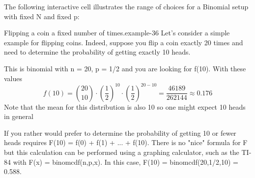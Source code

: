 \documentclass[10pt,]{book}
\numberwithin{equation}{section}
\begin{document}
\hypertarget{p-904}{}%
The following interactive cell illustrates the range of choices for a Binomial setup with fixed N and fixed p:%
\par
\hypertarget{p-905}{}%
\leavevmode%
%
\begin{example}{Flipping a coin a fixed number of times.}{example-36}%
\hypertarget{p-906}{}%
Let's consider a simple example for flipping coins. Indeed, suppose you flip a coin exactly 20 times and need to determine the probability of getting exactly 10 heads.%
\par
\hypertarget{p-907}{}%
This is binomial with n = 20, p = 1/2 and you are looking for f(10). With these values%
\begin{equation*}
f(10) = \binom{20}{10} \cdot \left ( \frac{1}{2} \right )^{10} \cdot \left ( \frac{1}{2} \right 	)^{20-10} = \frac{46189}{262144} \approx 0.176
\end{equation*}
Note that the mean for this distribution is also 10 so one might expect 10 heads in general%
\par
\hypertarget{p-908}{}%
If you rather would prefer to determine the probability of getting 10 or fewer heads requires F(10) = f(0) + f(1) + ... + f(10). There is no "nice" formula for F but this calculation can be performed using a graphing calculator, such as the TI-84 with F(x) = binomcdf(n,p,x). In this case, F(10) = binomcdf(20,1/2,10) = 0.588.%
\end{example}
\end{document}
